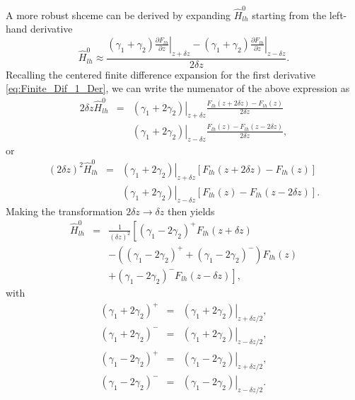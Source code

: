 A more robust shceme can be derived by expanding $\hat{H}_{lh}^{0}$
starting from the left-hand derivative \begin{equation}
\hat{H}_{lh}^{0}\approx\frac{\left.\left(\gamma_{1}+\gamma_{2}\right)\frac{\partial F_{lh}}{\partial z}\right|_{z+\delta z}-\left.\left(\gamma_{1}+\gamma_{2}\right)\frac{\partial F_{lh}}{\partial z}\right|_{z-\delta z}}{2\delta z}.\end{equation}
Recalling the centered finite difference expansion for the first derivative
\ref{eq:Finite_Dif_1_Der}, we can write the numenator of the above
expression as \begin{eqnarray}
2\delta z\hat{H}_{lh}^{0} & = & \left.\left(\gamma_{1}+2\gamma_{2}\right)\right|_{z+\delta z}\frac{F_{lh}(z+2\delta z)-F_{lh}(z)}{2\delta z}\nonumber \\
 &  & \left.\left(\gamma_{1}+2\gamma_{2}\right)\right|_{z-\delta z}\frac{F_{lh}(z)-F_{lh}(z-2\delta z)}{2\delta z},\end{eqnarray}
or \begin{eqnarray}
(2\delta z)^{2}\hat{H}_{lh}^{0} & = & \left.\left(\gamma_{1}+2\gamma_{2}\right)\right|_{z+\delta z}\left[F_{lh}(z+2\delta z)-F_{lh}(z)\right]\nonumber \\
 &  & \left.\left(\gamma_{1}+2\gamma_{2}\right)\right|_{z-\delta z}\left[F_{lh}(z)-F_{lh}(z-2\delta z)\right].\end{eqnarray}
Making the transformation $2\delta z\rightarrow\delta z$ then yields
\begin{eqnarray}
\hat{H}_{lh}^{0} & = & \frac{1}{(\delta z)^{2}}\left[\left(\gamma_{1}-2\gamma_{2}\right)^{+}F_{lh}(z+\delta z)\right.\nonumber \\
 &  & -\left(\left(\gamma_{1}-2\gamma_{2}\right)^{+}+\left(\gamma_{1}-2\gamma_{2}\right)^{-}\right)F_{lh}(z)\nonumber \\
 &  & \left.+\left(\gamma_{1}-2\gamma_{2}\right)^{-}F_{lh}(z-\delta z)\right],\end{eqnarray}
with \begin{eqnarray}
\left(\gamma_{1}+2\gamma_{2}\right)^{+} & = & \left.\left(\gamma_{1}+2\gamma_{2}\right)\right|_{z+\delta z/2},\\
\left(\gamma_{1}+2\gamma_{2}\right)^{-} & = & \left.\left(\gamma_{1}+2\gamma_{2}\right)\right|_{z-\delta z/2},\\
\left(\gamma_{1}-2\gamma_{2}\right)^{+} & = & \left.\left(\gamma_{1}-2\gamma_{2}\right)\right|_{z+\delta z/2},\\
\left(\gamma_{1}-2\gamma_{2}\right)^{-} & = & \left.\left(\gamma_{1}-2\gamma_{2}\right)\right|_{z-\delta z/2}.\end{eqnarray}
